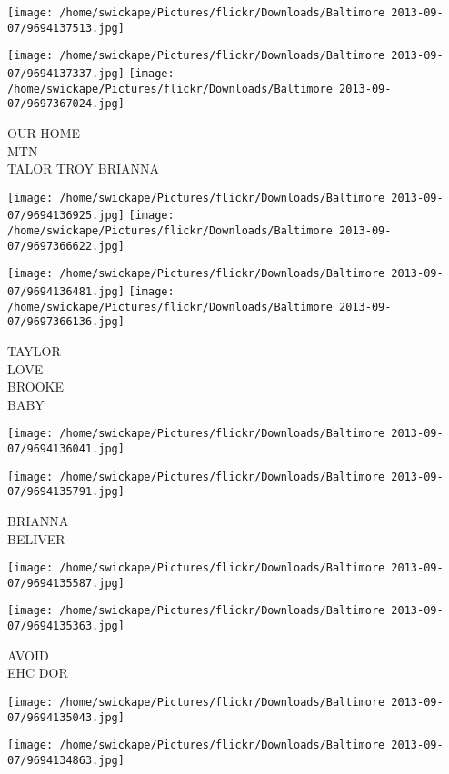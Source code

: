 \documentclass[10pt,letterpaper]{article}
\begin{document}
\texttt{[image: /home/swickape/Pictures/flickr/Downloads/Baltimore 2013-09-07/9694137513.jpg]}

\vspace{0.25in}
\texttt{[image: /home/swickape/Pictures/flickr/Downloads/Baltimore 2013-09-07/9694137337.jpg]}
\texttt{[image: /home/swickape/Pictures/flickr/Downloads/Baltimore 2013-09-07/9697367024.jpg]}

OUR HOME\\
MTN\\
TALOR TROY BRIANNA
\pagebreak

\texttt{[image: /home/swickape/Pictures/flickr/Downloads/Baltimore 2013-09-07/9694136925.jpg]}
\texttt{[image: /home/swickape/Pictures/flickr/Downloads/Baltimore 2013-09-07/9697366622.jpg]}

\texttt{[image: /home/swickape/Pictures/flickr/Downloads/Baltimore 2013-09-07/9694136481.jpg]}
\texttt{[image: /home/swickape/Pictures/flickr/Downloads/Baltimore 2013-09-07/9697366136.jpg]}

TAYLOR\\
LOVE\\
BROOKE\\
BABY
\pagebreak

\texttt{[image: /home/swickape/Pictures/flickr/Downloads/Baltimore 2013-09-07/9694136041.jpg]}

\vspace{0.25in}
\texttt{[image: /home/swickape/Pictures/flickr/Downloads/Baltimore 2013-09-07/9694135791.jpg]}

BRIANNA\\
BELIVER
\pagebreak

\texttt{[image: /home/swickape/Pictures/flickr/Downloads/Baltimore 2013-09-07/9694135587.jpg]}

\vspace{0.25in}
\texttt{[image: /home/swickape/Pictures/flickr/Downloads/Baltimore 2013-09-07/9694135363.jpg]}

AVOID\\
EHC DOR
\pagebreak

\texttt{[image: /home/swickape/Pictures/flickr/Downloads/Baltimore 2013-09-07/9694135043.jpg]}

\vspace{0.25in}
\texttt{[image: /home/swickape/Pictures/flickr/Downloads/Baltimore 2013-09-07/9694134863.jpg]}
\end{document}
